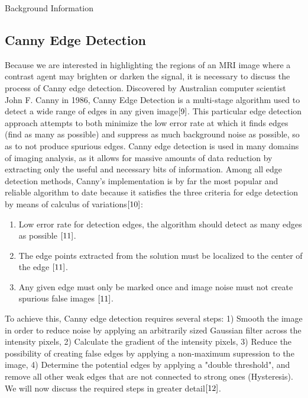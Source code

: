 \documentclass[a4paper,12pt]{article}
\begin{document}
\begin{section}{Background Information}

\subsection{Canny Edge Detection}

Because we are interested in highlighting the regions of an MRI image where a contrast agent may brighten or darken the signal, it is necessary to discuss the process of Canny edge detection. Discovered by Australian computer scientist John F. Canny in 1986, Canny Edge Detection is a multi-stage algorithm used to detect a wide range of edges in any given image$\cite{9}$.
This particular edge detection approach attempts to both minimize the low error rate at which it finds edges (find as many as possible) and suppress as much background noise as possible, so as to not produce spurious edges. Canny edge detection is used in many domains of imaging analysis, as it allows for massive amounts of data reduction by extracting only the useful and necessary bits of information. Among all edge detection methods, Canny's implementation is by far the most popular and reliable algorithm to date because it satisfies the three criteria for edge detection by means of calculus of variations$\cite{10}$:\\

\singlespacing
\begin{enumerate}
\item Low error rate for detection edges, the algorithm should detect as many edges as possible  $\cite{11}$.
\item The edge points extracted from the solution must be localized to the center of the edge  $\cite{11}$.
\item Any given edge must only be marked once and image noise must not create spurious false images  $\cite{11}$.
\end{enumerate}
\doublespacing

To achieve this, Canny edge detection requires several steps: 1) Smooth the image in order to reduce noise by applying an arbitrarily sized Gaussian filter across the intensity pixels, 2) Calculate the gradient of the intensity pixels, 3) Reduce the possibility of creating false edges by applying a non-maximum supression to the image, 4) Determine the potential edges by applying a "double threshold", and remove all other weak edges that are not connected to strong ones (Hysteresis). We will now discuss the required steps in greater detail$\cite{12}$.


\end{section}
\end{document}
